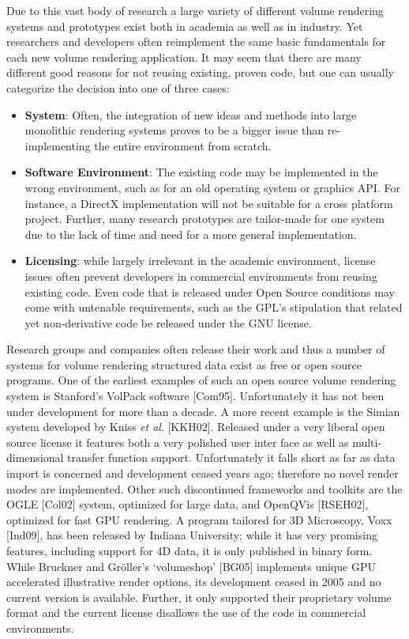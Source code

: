 Due to this vast body of research a large variety of different volume
rendering systems and prototypes exist both in academia as well as
in industry. Yet researchers and developers often reimplement the
same basic fundamentals for each new volume rendering application. It
may seem that there are many different good reasons for not reusing
existing, proven code, but one can usually categorize the decision into
one of three cases:

\begin{itemize}

  \item \textbf{System}:
	Often, the integration of new ideas and methods
	into large monolithic rendering systems proves to be a
	bigger issue than re-implementing the entire environment
	from scratch.

  \item \textbf{Software Environment}: The existing code may be
  implemented in the wrong environment, such as for an old operating
  system or graphics API. For instance, a DirectX implementation will
  not be suitable for a cross platform project. Further, many research
  prototypes are tailor-made for one system due to the lack of time and
  need for a more general implementation.

  \item \textbf{Licensing}: while largely irrelevant in the academic
  environment, license issues often prevent developers in commercial
  environments from reusing existing code. Even code that is released
  under Open Source conditions may come with untenable requirements,
  such as the GPL's stipulation that related yet non-derivative code be
  released under the GNU license.

\end{itemize}

Research groups and companies often release their work and thus a
number of systems for volume rendering structured data exist as free
or open source programs. One of the earliest examples of such an
open source volume rendering system is Stanford's VolPack software
[Com95]. Unfortunately it has not been under development for more than
a decade. A more recent example is the Simian system developed
by Kniss \textit{et al}. [KKH02]. Released under a very liberal open
source license it features both a very polished user inter face as
well as multi-dimensional transfer function support. Unfortunately it
falls short as far as data import is concerned and development ceased
years ago; therefore no novel render modes are implemented. Other such
discontinued frameworks and toolkits are the OGLE [Col02] system,
optimized for large data, and OpenQVis [RSEH02], optimized for fast GPU
rendering. A program tailored for 3D Microscopy, Voxx [Ind09], has been
released by Indiana University; while it has very promising features,
including support for 4D data, it is only published in binary form.
While Bruckner and Gr\"oller's `volumeshop' [BG05] implements unique
GPU accelerated illustrative render options, its development ceased in
2005 and no current version is available. Further, it only supported
their proprietary volume format and the current license disallows the
use of the code in commercial environments.

